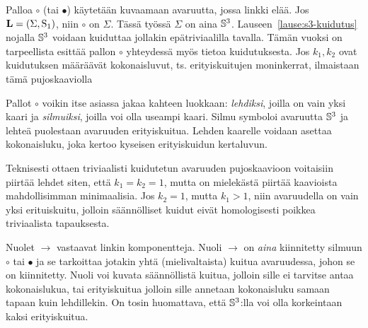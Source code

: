 \begin{konstruktio}
    Palloa $\circ$ (tai $\bullet$) käytetään kuvaamaan avaruutta, jossa linkki elää. Jos $\linkki=(\Sigma,\solmu_1)$, niin $\circ$ on $\Sigma$. Tässä työssä $\Sigma$ on aina $\S^3$. Lauseen~\ref{lause:s3-kuidutus} nojalla $\S^3$ voidaan kuiduttaa jollakin epätriviaalilla tavalla. Tämän vuoksi on tarpeellista esittää pallon $\circ$ yhteydessä myös tietoa kuidutuksesta. Jos $k_1,k_2$ ovat kuidutuksen määräävät kokonaisluvut, ts. erityiskuitujen moninkerrat, ilmaistaan tämä pujoskaaviolla
    \begin{center}
    \end{center}
    Pallot $\circ$ voikin itse asiassa jakaa kahteen luokkaan: \emph{lehdiksi}, joilla on vain yksi kaari ja \emph{silmuiksi}, joilla voi olla useampi kaari. Silmu symboloi avaruutta $\S^3$ ja lehteä puolestaan avaruuden erityiskuitua. Lehden kaarelle voidaan asettaa kokonaisluku, joka kertoo kyseisen erityiskuidun kertaluvun.

    Teknisesti ottaen triviaalisti kuidutetun avaruuden pujoskaavioon voitaisiin piirtää lehdet siten, että $k_1=k_2=1$, mutta on mielekästä piirtää kaavioista mahdollisimman minimaalisia. Jos $k_2=1$, mutta $k_1>1$, niin avaruudella on vain yksi erituiskuitu, jolloin säännölliset kuidut eivät homologisesti poikkea triviaalista tapauksesta.

    Nuolet $\rightarrow$ vastaavat linkin komponentteja. Nuoli $\rightarrow$ on \emph{aina} kiinnitetty silmuun $\circ$ tai $\bullet$ ja se tarkoittaa jotakin yhtä (mielivaltaista) kuitua avaruudessa, johon se on kiinnitetty. Nuoli voi kuvata säännöllistä kuitua, jolloin sille ei tarvitse antaa kokonaislukua, tai erityiskuitua jolloin sille annetaan kokonaisluku samaan tapaan kuin lehdillekin. On tosin huomattava, että $\S^3$:lla voi olla korkeintaan kaksi erityiskuitua.


\end{konstruktio}
